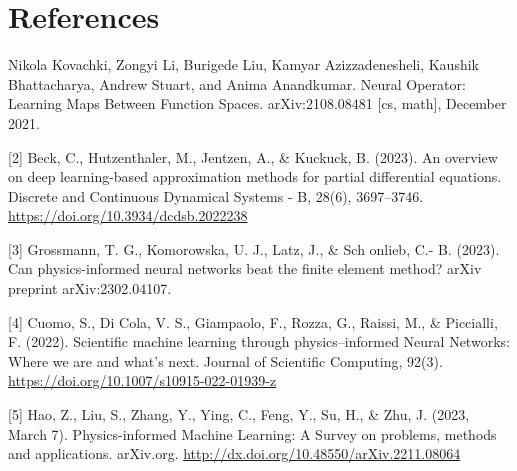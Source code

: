 \documentclass[a4paper, 12pt]{article}
\begin{document}
\newpage
\section*{References}
\singlespacing
[1] Nikola Kovachki, Zongyi Li, Burigede Liu, Kamyar Azizzadenesheli, Kaushik Bhattacharya, Andrew Stuart, and
Anima Anandkumar. Neural Operator: Learning Maps Between Function Spaces. arXiv:2108.08481 [cs, math],
December 2021.

[2] Beck, C., Hutzenthaler, M., Jentzen, A., \& Kuckuck, B. (2023). An overview on deep learning-based approximation methods for partial differential equations. Discrete and Continuous Dynamical Systems - B, 28(6), 3697–3746. \url{https://doi.org/10.3934/dcdsb.2022238 }

[3] Grossmann, T. G., Komorowska, U. J., Latz, J., \& Sch onlieb, C.-
B. (2023). Can physics-informed neural networks beat the finite
element method? arXiv preprint arXiv:2302.04107.

[4] Cuomo, S., Di Cola, V. S., Giampaolo, F., Rozza, G., Raissi, M., \& Piccialli, F. (2022). Scientific machine learning through physics–informed Neural Networks: Where we are and what’s next. Journal of Scientific Computing, 92(3). \url{https://doi.org/10.1007/s10915-022-01939-z} 

[5] Hao, Z., Liu, S., Zhang, Y., Ying, C., Feng, Y., Su, H., \& Zhu, J. (2023, March 7). Physics-informed Machine Learning: A Survey on problems, methods and applications. arXiv.org. \url{http://dx.doi.org/10.48550/arXiv.2211.08064}

\end{document}
